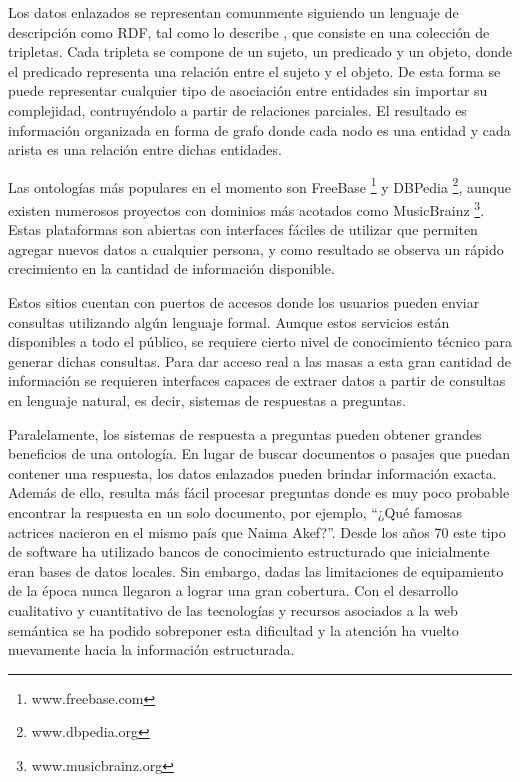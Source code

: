 Los datos enlazados se representan comunmente siguiendo un lenguaje de descripción como RDF, tal como lo describe \citet{brickleyRDF}, que consiste en una colección de tripletas. Cada tripleta se compone de un sujeto, un predicado y un objeto, donde el predicado representa una relación entre el sujeto y el objeto. De esta forma se puede representar cualquier tipo de asociación entre entidades sin importar su complejidad, contruyéndolo a partir de relaciones parciales. El resultado es información organizada en forma de grafo donde cada nodo es una entidad y cada arista es una relación entre dichas entidades.

Las ontologías más populares en el momento son FreeBase \footnote{www.freebase.com} y DBPedia \footnote{www.dbpedia.org}, aunque existen numerosos proyectos con dominios más acotados como MusicBrainz \footnote{www.musicbrainz.org}. Estas plataformas son abiertas con interfaces fáciles de utilizar que permiten agregar nuevos datos a cualquier persona, y como resultado se observa un rápido crecimiento en la cantidad de información disponible.

Estos sitios cuentan con puertos de accesos donde los usuarios pueden enviar consultas utilizando algún lenguaje formal. Aunque estos servicios están disponibles a todo el público, se requiere cierto nivel de conocimiento técnico para generar dichas consultas. Para dar acceso real a las masas a esta gran cantidad de información se requieren interfaces capaces de extraer datos a partir de consultas en lenguaje natural, es decir, sistemas de respuestas a preguntas.

Paralelamente, los sistemas de respuesta a preguntas pueden obtener grandes beneficios de una ontología. En lugar de buscar documentos o pasajes que puedan contener una respuesta, los datos enlazados pueden brindar información exacta. Además de ello, resulta más fácil procesar preguntas donde es muy poco probable encontrar la respuesta en un solo documento, por ejemplo, ``¿Qué famosas actrices nacieron en el mismo país que Naima Akef?''. Desde los años 70 este tipo de software ha utilizado bancos de conocimiento estructurado que inicialmente eran bases de datos locales. Sin embargo, dadas las limitaciones de equipamiento de la época nunca llegaron a lograr una gran cobertura. Con el desarrollo cualitativo y cuantitativo de las tecnologías y recursos asociados a la web semántica se ha podido sobreponer esta dificultad y la atención ha vuelto nuevamente hacia la información estructurada.

